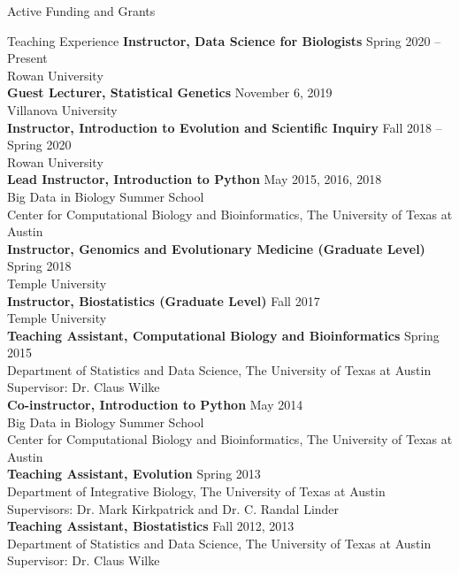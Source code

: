 \documentclass{resume} %
\begin{document}
\begin{rSection}{Active Funding and Grants}
\begin{rSection}{Teaching Experience}
\textbf{Instructor, Data Science for Biologists} \hfill Spring 2020 -- Present  \\ Rowan University \\

\textbf{Guest Lecturer, Statistical Genetics} \hfill November 6, 2019 \\ Villanova University \\ 

\textbf{Instructor, Introduction to Evolution and Scientific Inquiry} \hfill Fall 2018 -- Spring 2020  \\ Rowan University \\

\textbf{Lead Instructor, Introduction to Python} \hfill May 2015, 2016, 2018 \\ Big Data in Biology Summer School \\ Center for Computational Biology and Bioinformatics, The University of Texas at Austin \\

\textbf{Instructor, Genomics and Evolutionary Medicine (Graduate Level)} \hfill Spring 2018 \\ Temple University \\

\textbf{Instructor, Biostatistics (Graduate Level)} \hfill Fall 2017 \\ Temple University \\

\textbf{Teaching Assistant, Computational Biology and Bioinformatics} \hfill Spring 2015 \\ Department of Statistics and Data Science, The University of Texas at Austin \\
Supervisor: Dr. Claus Wilke \\

\textbf{Co-instructor, Introduction to Python} \hfill May 2014 \\ Big Data in Biology Summer School \\ Center for Computational Biology and Bioinformatics, The University of Texas at Austin \\

\textbf{Teaching Assistant, Evolution} \hfill Spring 2013 \\ Department of Integrative Biology, The University of Texas at Austin \\
Supervisors: Dr. Mark Kirkpatrick and Dr. C. Randal Linder \\

\textbf{Teaching Assistant, Biostatistics} \hfill Fall 2012, 2013 \\ Department of Statistics and Data Science, The University of Texas at Austin \\
Supervisor: Dr. Claus Wilke \\


\end{rSection}
\end{rSection}
\end{document}
